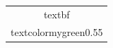 \documentclass{ieeeaccess}
\begin{document}
\begin{tabular}{c}
\\textbf{\\textcolor{mygreen}{0.55}}
\end{tabular}
\end{document}
